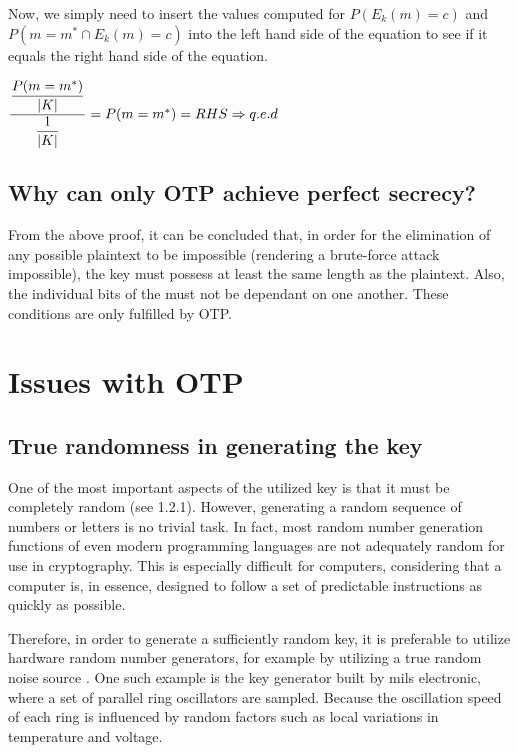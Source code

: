 \documentclass[12pt]{report}
\begin{document}
Now, we simply need to insert the values computed for $P({E_k}(m)=c)$ and $P(m=m^{*} \cap {E_k}(m)=c)$ into the left hand side of the equation to see if it equals the right hand side of the equation.

$\dfrac{\dfrac{P(m=m^{*})}{\lvert K \rvert}}{\dfrac{1}{\lvert K \rvert}} = P(m=m^{*}) \\
= RHS \\
\Rightarrow q.e.d$

\subsection{Why can only OTP achieve perfect secrecy?}

From the above proof, it can be concluded that, in order for the elimination of any possible plaintext to be impossible (rendering a brute-force attack impossible), the key must possess at least the same length as the plaintext. Also, the individual bits of the must not be dependant on one another. These conditions are only fulfilled by OTP.  

\section{Issues with OTP}
\subsection{True randomness in generating the key}
One of the most important aspects of the utilized key is that it must be completely random (see 1.2.1). However, generating a random sequence of numbers or letters is no trivial task. In fact, most random number generation functions of even modern programming languages are not adequately random for use in cryptography. This is especially difficult for computers, considering that a computer is, in essence, designed to follow a set of predictable instructions as quickly as possible.

Therefore, in order to generate a sufficiently random key, it is preferable to utilize hardware random number generators, for example by utilizing a true random noise source \cite{MilsElectronic}. One such example is the key generator built by mils electronic, where a set of parallel ring oscillators are sampled. Because the oscillation speed of each ring is influenced by random factors such as local variations in temperature and voltage.
\end{document}
